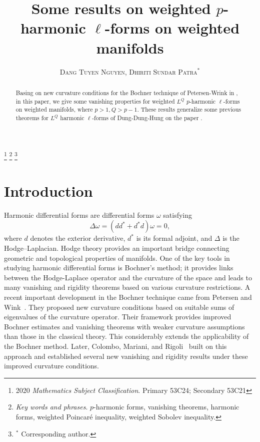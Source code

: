 \documentclass[leqno,12pt]{article} %
\title{{Some results on weighted $p$-harmonic $\ell$-forms on weighted manifolds}} %
\author{
%
%
\textsc{Dang Tuyen Nguyen, Dhiriti Sundar Patra$^*$} %
}
\date{} %
\theoremstyle{plain} %
\theoremstyle{definition} %
\numberwithin{equation}{section}
\begin{document}
\maketitle

\footnote{ %
	2020 \textit{Mathematics Subject Classification}.
	Primary 53C24; Secondary 53C21
}
\footnote{ %
	\textit{Key words and phrases}.
	$p$-harmonic forms, vanishing theorems, harmonic forms, weighted Poincar\'e inequality, weighted Sobolev inequality.
}
\footnote{ %
			$^{*}$ Corresponding author. 
	}
	\begin{abstract}
Basing on new curvature conditions for the Bochner
technique of Petersen-Wrink in \cite{PW21}, in this paper, we give some vanishing properties for 
weighted $L^Q$ $p$-harmonic $\ell$-forms on weighted manifolds, where $p>1, Q>p-1.$ These results generalize some previous theorems for $L^Q$ harmonic $\ell$-forms of Dung-Dung-Hung on the paper \cite{DDH25}.
	\end{abstract}
\section{Introduction}


Harmonic differential forms are differential forms $\omega$ satisfying
\[
\Delta\omega=(dd^{*}+d^{*}d)\omega=0,
\]
where $d$ denotes the exterior derivative, $d^{*}$ is its formal adjoint, and $\Delta$ is the Hodge--Laplacian. Hodge theory provides an important bridge connecting geometric and topological properties of manifolds. One of the key tools in studying harmonic differential forms is Bochner’s method; it provides links between the Hodge-Laplace operator and the curvature of the space and leads to many vanishing and rigidity theorems based on various curvature restrictions.
A recent important development in the Bochner technique came from Petersen and Wink~\cite{PW20,PW21,PW22}. They proposed new curvature conditions based on suitable sums of eigenvalues of the curvature operator. Their framework provides improved Bochner estimates and vanishing theorems with weaker curvature assumptions than those in the classical theory. This considerably extends the applicability of the Bochner method.  Later, Colombo, Mariani, and Rigoli~\cite{CMR24} built on this approach and established several new vanishing and rigidity results under these improved curvature conditions.
\end{document}

